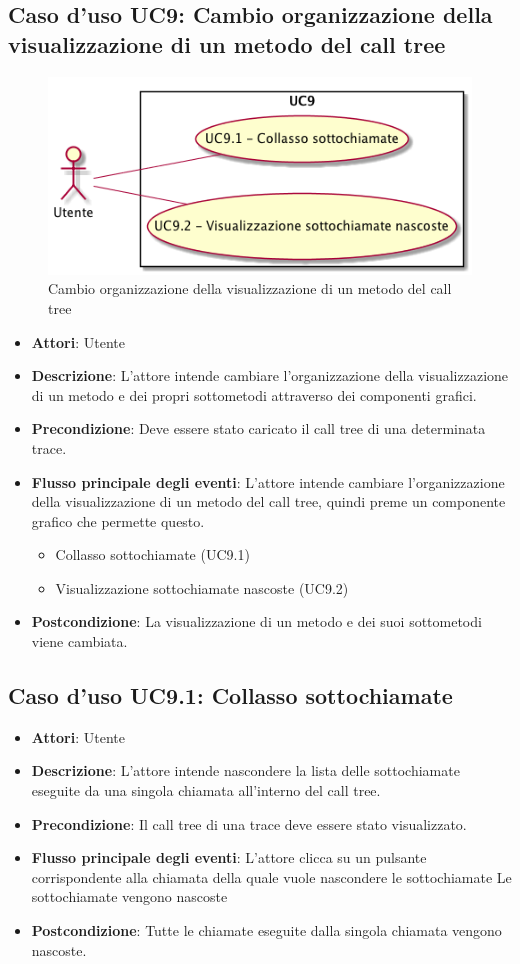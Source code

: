 \subsection{Caso d'uso UC9: Cambio organizzazione della visualizzazione di un metodo del call tree}
\begin{figure} [H]
\centering
\includegraphics[scale=0.45]{./UC/UC9.png}
\caption{Cambio organizzazione della visualizzazione di un metodo del call tree}\label{}
\end{figure}
\begin{itemize}
\item \textbf{Attori}: Utente
\item \textbf{Descrizione}: L'attore intende cambiare l'organizzazione della visualizzazione di un metodo e dei propri sottometodi attraverso dei componenti grafici.
\item \textbf{Precondizione}: Deve essere stato caricato il call tree di una determinata trace.
\item \textbf{Flusso principale degli eventi}: L'attore intende cambiare l'organizzazione della visualizzazione di un metodo del call tree, quindi preme un componente grafico che permette questo.
\begin{itemize}
\item Collasso sottochiamate (UC9.1)
\item Visualizzazione sottochiamate nascoste (UC9.2)
\end{itemize}
\item \textbf{Postcondizione}: La visualizzazione di un metodo e dei suoi sottometodi viene cambiata.
\end{itemize}
\subsection{Caso d'uso UC9.1: Collasso sottochiamate}
\begin{itemize}
\item \textbf{Attori}: Utente
\item \textbf{Descrizione}: L'attore intende nascondere la lista delle sottochiamate eseguite da una singola chiamata all'interno del call tree.
\item \textbf{Precondizione}: Il call tree di una trace deve essere stato visualizzato.
\item \textbf{Flusso principale degli eventi}: L'attore clicca su un pulsante corrispondente alla chiamata della quale vuole nascondere le sottochiamate
Le sottochiamate vengono nascoste
\item \textbf{Postcondizione}: Tutte le chiamate eseguite dalla singola chiamata vengono nascoste.
\end{itemize}
